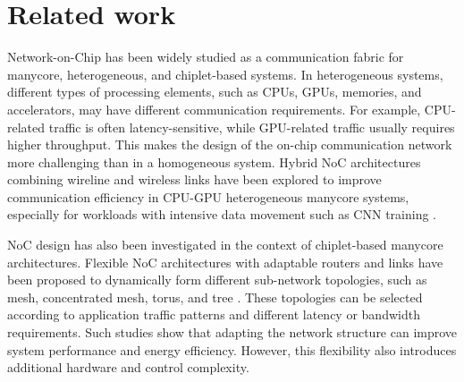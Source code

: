 \section{Related work}
Network-on-Chip has been widely studied as a communication fabric for manycore, heterogeneous, and chiplet-based systems. In heterogeneous systems, different types of processing elements, such as CPUs, GPUs, memories, and accelerators, may have different communication requirements. For example, CPU-related traffic is often latency-sensitive, while GPU-related traffic usually requires higher throughput. This makes the design of the on-chip communication network more challenging than in a homogeneous system. Hybrid NoC architectures combining wireline and wireless links have been explored to improve communication efficiency in CPU-GPU heterogeneous manycore systems, especially for workloads with intensive data movement such as CNN training \cite{8119941}.

NoC design has also been investigated in the context of chiplet-based manycore architectures. Flexible NoC architectures with adaptable routers and links have been proposed to dynamically form different sub-network topologies, such as mesh, concentrated mesh, torus, and tree \cite{9218654}. These topologies can be selected according to application traffic patterns and different latency or bandwidth requirements. Such studies show that adapting the network structure can improve system performance and energy efficiency. However, this flexibility also introduces additional hardware and control complexity.